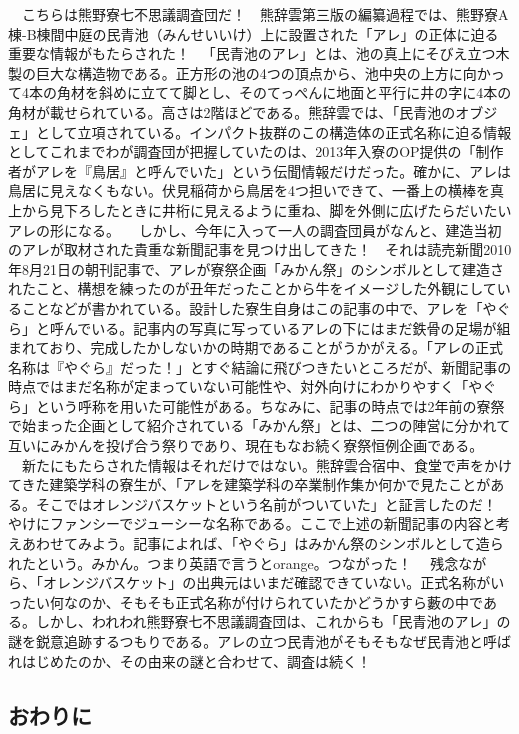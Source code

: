 　こちらは熊野寮七不思議調査団だ！　熊辞雲第三版の編纂過程では、熊野寮A棟-B棟間中庭の民青池（みんせいいけ）上に設置された「アレ」の正体に迫る重要な情報がもたらされた！
　「民青池のアレ」とは、池の真上にそびえ立つ木製の巨大な構造物である。正方形の池の4つの頂点から、池中央の上方に向かって4本の角材を斜めに立てて脚とし、そのてっぺんに地面と平行に井の字に4本の角材が載せられている。高さは2階ほどである。熊辞雲では、「民青池のオブジェ」として立項されている。インパクト抜群のこの構造体の正式名称に迫る情報としてこれまでわが調査団が把握していたのは、2013年入寮のOP提供の「制作者がアレを『鳥居』と呼んでいた」という伝聞情報だけだった。確かに、アレは鳥居に見えなくもない。伏見稲荷から鳥居を4つ担いできて、一番上の横棒を真上から見下ろしたときに井桁に見えるように重ね、脚を外側に広げたらだいたいアレの形になる。
　しかし、今年に入って一人の調査団員がなんと、建造当初のアレが取材された貴重な新聞記事を見つけ出してきた！　それは読売新聞2010年8月21日の朝刊記事で、アレが寮祭企画「みかん祭」のシンボルとして建造されたこと、構想を練ったのが丑年だったことから牛をイメージした外観にしていることなどが書かれている。設計した寮生自身はこの記事の中で、アレを「やぐら」と呼んでいる。記事内の写真に写っているアレの下にはまだ鉄骨の足場が組まれており、完成したかしないかの時期であることがうかがえる。「アレの正式名称は『やぐら』だった！」とすぐ結論に飛びつきたいところだが、新聞記事の時点ではまだ名称が定まっていない可能性や、対外向けにわかりやすく「やぐら」という呼称を用いた可能性がある。ちなみに、記事の時点では2年前の寮祭で始まった企画として紹介されている「みかん祭」とは、二つの陣営に分かれて互いにみかんを投げ合う祭りであり、現在もなお続く寮祭恒例企画である。
　新たにもたらされた情報はそれだけではない。熊辞雲合宿中、食堂で声をかけてきた建築学科の寮生が、「アレを建築学科の卒業制作集か何かで見たことがある。そこではオレンジバスケットという名前がついていた」と証言したのだ！　やけにファンシーでジューシーな名称である。ここで上述の新聞記事の内容と考えあわせてみよう。記事によれば、「やぐら」はみかん祭のシンボルとして造られたという。みかん。つまり英語で言うとorange。つながった！
　残念ながら、「オレンジバスケット」の出典元はいまだ確認できていない。正式名称がいったい何なのか、そもそも正式名称が付けられていたかどうかすら藪の中である。しかし、われわれ熊野寮七不思議調査団は、これからも「民青池のアレ」の謎を鋭意追跡するつもりである。アレの立つ民青池がそもそもなぜ民青池と呼ばれはじめたのか、その由来の謎と合わせて、調査は続く！
 


\subsection{おわりに}

